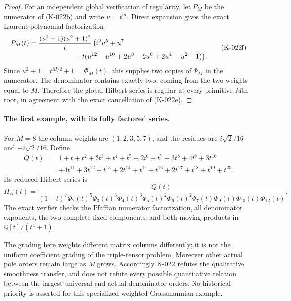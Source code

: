 \begin{proof}
For an independent global verification of regularity, let $P_M$
be the numerator of (K-022b) and write $u=t^m$.  Direct expansion
gives the exact Laurent-polynomial factorization
\[
\begin{split}
 P_M(t)={}&\frac{(u^2-1)(u^2+1)^2}{t}\,
 \bigl(t^2u^5+u^7\\
 &\hspace{18mm}-t(u^{12}-u^{10}+2u^8-2u^6+2u^4-u^2+1)\bigr).
\end{split}                                                   \tag{K-022f}
\]
Since $u^2+1=t^{M/2}+1=\Phi_M(t)$, this supplies two copies of
$\Phi_M$ in the numerator.  The denominator contains exactly two,
coming from the two weights equal to $M$.  Therefore the global
Hilbert series is regular at every primitive $M$th root, in
agreement with the exact cancellation of (K-022e).
\end{proof}

\paragraph{The first example, with its fully factored series.}
For $M=8$ the column weights are $(1,2,3,5,7)$, and the residues
are $i\sqrt2/16$ and $-i\sqrt2/16$.  Define
\[
\begin{split}
 Q(t)={}&1+t+t^2+2t^3+t^4+t^5+2t^6+t^7+3t^8+4t^9+3t^{10}\\
        &+4t^{11}+3t^{12}+t^{13}+2t^{14}+t^{15}+t^{16}
                       +2t^{17}+t^{18}+t^{19}+t^{20}.
\end{split}
\]
Its reduced Hilbert series is
\[
 H_R(t)=\frac{Q(t)}
 {(1-t)^7\Phi_2(t)^5\Phi_3(t)^3\Phi_4(t)^3\Phi_5(t)^2
   \Phi_6(t)^2\Phi_7(t)\Phi_9(t)\Phi_{10}(t)\Phi_{12}(t)}.
                                                               \tag{K-022g}
\]
The exact verifier checks the Pfaffian numerator factorization,
all denominator exponents, the two complete fixed components,
and both moving products in $\mathbb Q[t]/(t^4+1)$.

The grading here weights different matrix columns differently;
it is not the uniform coefficient grading of the triple-tensor
problem.  Moreover other actual pole orders remain large as $M$
grows.  Accordingly K-022 refutes the qualitative smoothness
transfer, and does not refute every possible quantitative relation
between the largest universal and actual denominator orders.
No historical priority is asserted for this specialized weighted
Grassmannian example.
